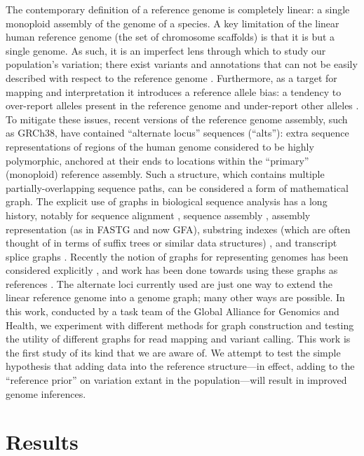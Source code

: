 The contemporary definition of a reference genome is completely linear:
a single monoploid assembly of the genome of a species. A key limitation
of the linear human reference genome (the set of chromosome scaffolds)
is that it is but a single genome. As such, it is an imperfect lens
through which to study our population's variation; there exist variants
and annotations that can not be easily described with respect to the
reference genome \cite{horton2008variation,Pei2012-xo}. Furthermore, as a
target for mapping and interpretation it introduces a reference allele
bias: a tendency to over-report alleles present in the reference genome
and under-report other alleles \cite{degner2009effect,brandt2015mapping}. To
mitigate these issues, recent versions of the reference genome assembly,
such as GRCh38, have contained ``alternate locus'' sequences (``alts''):
extra sequence representations of regions of the human genome considered
to be highly polymorphic, anchored at their ends to locations within the
``primary'' (monoploid) reference assembly. Such a structure, which
contains multiple partially-overlapping sequence paths, can be
considered a form of mathematical graph. The explicit use of graphs in
biological sequence analysis has a long history, notably for sequence
alignment \cite{paten2014mapping}, sequence assembly
\cite{Pevzner2001-lm,Myers2005-oi}, assembly representation (as in FASTG
and now GFA)\cite{fastg2016fastg,GFA-spec_contributors_undated-tg},
substring indexes (which are often thought of in terms of suffix trees
or similar data structures) \cite{li2009fast,Simpson2010-of}, and
transcript splice graphs \cite{Heber2002-pw}. Recently the notion of
graphs for representing genomes has been considered explicitly
\cite{dilthey2015improved,paten2014mapping,maciuca2016natural}, and work has been
done towards using these graphs as references \cite{Limasset2016-by}.
The alternate loci currently used are just one way to extend the linear
reference genome into a genome graph; many other ways are possible. In
this work, conducted by a task team of the Global Alliance for Genomics
and Health, we experiment with different methods for graph construction
and testing the utility of different graphs for read mapping and variant
calling. This work is the first study of its kind that we are aware of.
We attempt to test the simple hypothesis that adding data into the
reference structure---in effect, adding to the ``reference prior'' on
variation extant in the population---will result in improved genome
inferences.

\section{Results}


